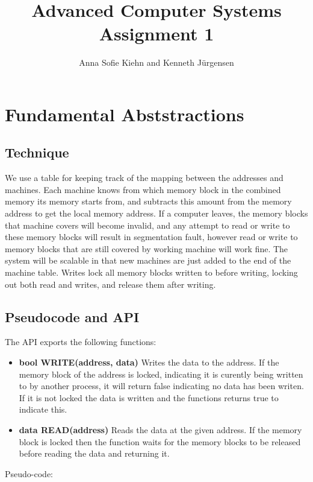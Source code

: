 \documentclass{article}
\theoremstyle{plain}
\theoremstyle{nonumberplain}
\begin{document}
\title{Advanced Computer Systems \\ Assignment 1}

\author{Anna Sofie Kiehn and Kenneth Jürgensen}

\maketitle

\section{Fundamental Abststractions}

\subsection{Technique}

We use a table for keeping track of the mapping between the addresses and machines. Each machine knows from which memory block in the combined memory its memory starts from, and subtracts this amount from the memory address to get the local memory address. If a computer leaves, the memory blocks that machine covers will become invalid, and any attempt to read or write to these memory blocks will result in segmentation fault, however read or write to memory blocks that are still covered by working machine will work fine. The system will be scalable in that new machines are just added to the end of the machine table.
Writes lock all memory blocks written to before writing, locking out both read and writes, and release them after writing.

\subsection{Pseudocode and API}

The API exports the following functions:

\begin{itemize}

\item \textbf{bool WRITE(address, data)} Writes the data to the address. If the memory block of the address is locked, indicating it is curently being written to by another process, it will return false indicating no data has been writen. If it is not locked the data is written and the functions returns true to indicate this.

\item \textbf{data READ(address)} Reads the data at the given address. If the memory block is locked then the function waits for the memory blocks to be released before reading the data and returning it.

\end{itemize}
Pseudo-code:
\end{document}
